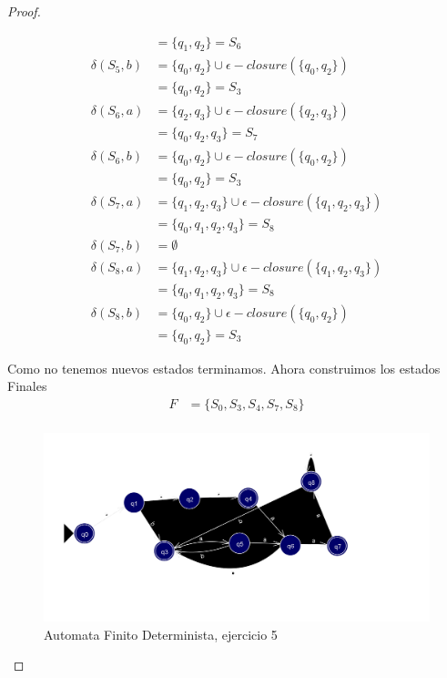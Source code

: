 \begin{proof}
\begin{enumerate}
\begin{align*}
            &= \{q_1,q_2\} = S_6 \\
            \delta(S_5,b) &= \{q_0,q_2\} \cup \epsilon-closure(\{q_0,q_2\}) \\
            &= \{q_0,q_2\} = S_3 \\
            \delta(S_6,a) &= \{q_2,q_3\} \cup \epsilon-closure(\{q_2,q_3\}) \\
            &= \{q_0,q_2,q_3\} = S_7 \\
            \delta(S_6,b) &= \{q_0,q_2\} \cup \epsilon-closure(\{q_0,q_2\}) \\
            &= \{q_0,q_2\} = S_3 \\
            \delta(S_7,a) &= \{q_1,q_2,q_3\} \cup \epsilon-closure(\{q_1,q_2,q_3\}) \\
            &= \{q_0,q_1,q_2,q_3\} = S_8 \\
            \delta(S_7,b) &= \emptyset \\ 
            \delta(S_8,a) &= \{q_1,q_2,q_3\} \cup \epsilon-closure(\{q_1,q_2,q_3\}) \\
            &= \{q_0,q_1,q_2,q_3\} = S_8 \\
            \delta(S_8,b) &= \{q_0,q_2\} \cup \epsilon-closure(\{q_0,q_2\}) \\
            &= \{q_0,q_2\} = S_3   
        \end{align*}

        Como no tenemos nuevos estados terminamos. Ahora construimos los estados Finales
        \begin{align*}
            F &= \{S_0,S_3,S_4,S_7,S_8\} \\
        \end{align*}
    \end{enumerate}
    \begin{figure}[h!]
            \centering
            \includegraphics[width=\textwidth]{images/ejercicio5-bueno-dark.png}
            \caption{Automata Finito Determinista, ejercicio 5}
    \end{figure}
\end{proof}